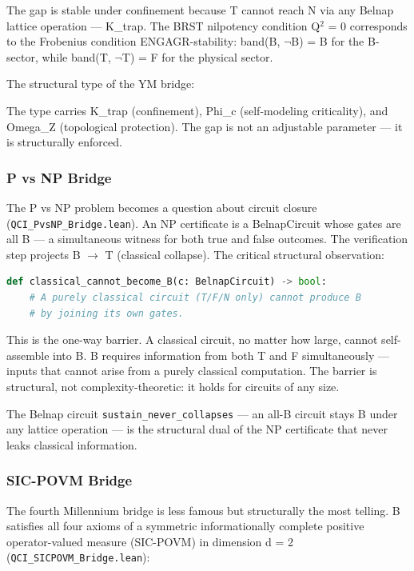 \documentclass[12pt,a4paper]{article}
\begin{document}
The gap is stable under confinement because T cannot reach N via any Belnap lattice operation --- K\_trap. The BRST nilpotency condition Q$^{2}$ = 0 corresponds to the Frobenius condition ENGAGR-stability: band(B, $\neg$B) = B for the B-sector, while band(T, $\neg$T) = F for the physical sector.

The structural type of the YM bridge:

The type carries K\_trap (confinement), Phi\_c (self-modeling criticality), and Omega\_Z (topological protection). The gap is not an adjustable parameter --- it is structurally enforced.

\subsubsection{P vs NP Bridge}

The P vs NP problem becomes a question about circuit closure (\texttt{QCI\_PvsNP\_Bridge.lean}). An NP certificate is a BelnapCircuit whose gates are all B --- a simultaneous witness for both true and false outcomes. The verification step projects B $\rightarrow$ T (classical collapse). The critical structural observation:

\begin{lstlisting}[language=Python]
def classical_cannot_become_B(c: BelnapCircuit) -> bool:
    # A purely classical circuit (T/F/N only) cannot produce B
    # by joining its own gates.
\end{lstlisting}

This is the one-way barrier. A classical circuit, no matter how large, cannot self-assemble into B. B requires information from both T and F simultaneously --- inputs that cannot arise from a purely classical computation. The barrier is structural, not complexity-theoretic: it holds for circuits of any size.

The Belnap circuit \texttt{sustain\_never\_collapses} --- an all-B circuit stays B under any lattice operation --- is the structural dual of the NP certificate that never leaks classical information.

\subsubsection{SIC-POVM Bridge}

The fourth Millennium bridge is less famous but structurally the most telling. B satisfies all four axioms of a symmetric informationally complete positive operator-valued measure (SIC-POVM) in dimension d = 2 (\texttt{QCI\_SICPOVM\_Bridge.lean}):
\end{document}
